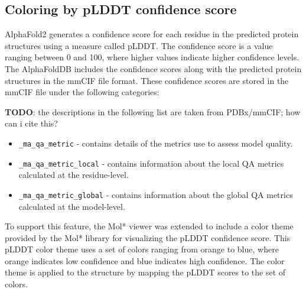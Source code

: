 \documentclass[
  digital,     %
  oneside,     %
  nosansbold,  %
  nocolorbold, %
  lof,         %
  lot,         %
]{fithesis4}
\begin{document}


\subsection{Coloring by pLDDT confidence score}

AlphaFold2 generates a confidence score for each residue in the predicted protein structures using a measure called pLDDT. The confidence score is a value ranging between 0 and 100, where higher values indicate higher confidence levels. \cite{varadi2021alphafold} The AlphaFoldDB includes the confidence scores along with the predicted protein structures in the mmCIF file format. These confidence scores are stored in the mmCIF file under the following categories:

\textbf{TODO}: the descriptions in the following list are taken from PDBx/mmCIF; how can i cite this? \\

\begin{itemize}
  \item \texttt{\_ma\_qa\_metric} - contains details of the metrics use to assess model quality.
  \item \texttt{\_ma\_qa\_metric\_local} - contains information about the local QA metrics calculated at the residue-level.
  \item \texttt{\_ma\_qa\_metric\_global} - contains information about the global QA metrics calculated at the model-level.
\end{itemize}

To support this feature, the Mol* viewer was extended to include a color theme provided by the Mol* library for visualizing the pLDDT confidence score. This pLDDT color theme uses a set of colors ranging from orange to blue, where orange indicates low confidence and blue indicates high confidence. The color theme is applied to the structure by mapping the pLDDT scores to the set of colors.
\end{document}

